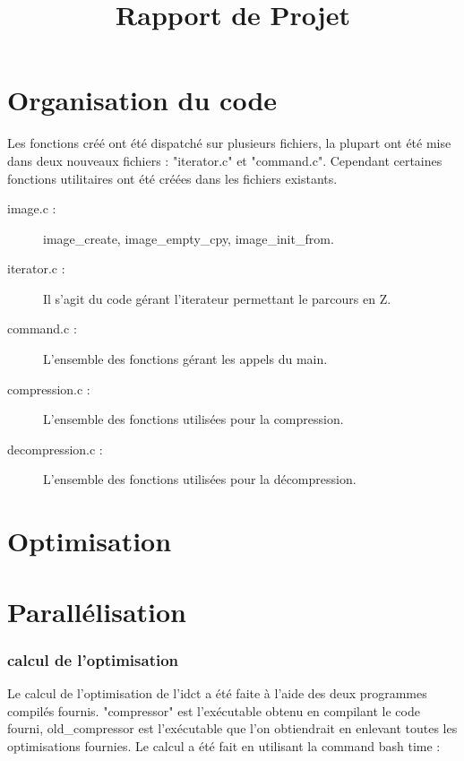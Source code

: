 \documentclass[10pt,a4paper]{report}
\title{Rapport de Projet}
\date{}
\begin{document}
\maketitle

\part*{Organisation du code}
Les fonctions créé ont été dispatché sur plusieurs fichiers, la plupart ont été mise dans deux nouveaux fichiers : "iterator.c" et "command.c".
Cependant certaines fonctions utilitaires ont été créées dans les fichiers existants.

\begin{description}
\item[image.c :] image\_create, image\_empty\_cpy, image\_init\_from.
\end{description}

\begin{description}
\item[iterator.c :] Il s'agit du code gérant l'iterateur permettant le parcours en Z.
\item[command.c :] L'ensemble des fonctions gérant les appels du main.
\item[compression.c :] L'ensemble des fonctions utilisées pour la compression.
\item[decompression.c :] L'ensemble des fonctions utilisées pour la décompression.
\end{description} 

\part*{Optimisation}



\part*{Parallélisation}

\section*{calcul de l'optimisation}
Le calcul de l'optimisation de l'idct a été faite à l'aide des deux programmes compilés fournis. "compressor" est l'exécutable obtenu en compilant le code fourni, old\_compressor est l'exécutable que l'on obtiendrait en enlevant toutes les optimisations fournies.
Le calcul a été fait en utilisant la command bash time :\\
\end{document}
